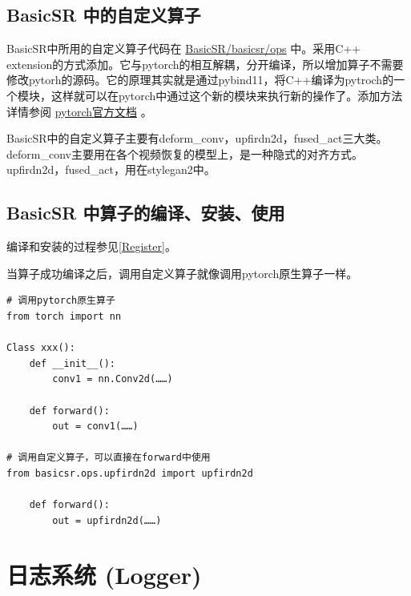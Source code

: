 \documentclass[../main.tex]{subfiles}
\begin{document}
\subsection{BasicSR 中的自定义算子}

BasicSR中所用的自定义算子代码在 \href{https://github.com/XPixelGroup/BasicSR/tree/master/basicsr/ops}{BasicSR/basicsr/ops} 中。采用C++ extension的方式添加。它与pytorch的相互解耦，分开编译，所以增加算子不需要修改pytorh的源码。它的原理其实就是通过pybind11，将C++编译为pytroch的一个模块，这样就可以在pytorch中通过这个新的模块来执行新的操作了。添加方法详情参阅 \href{https://pytorch.org/tutorials/advanced/cpp_extension.html#writing-a-mixed-c-cuda-extension}{pytorch官方文档} 。

BasicSR中的自定义算子主要有deform\_conv，upfirdn2d，fused\_act三大类。deform\_conv主要用在各个视频恢复的模型上，是一种隐式的对齐方式。upfirdn2d，fused\_act，用在stylegan2中。

\subsection{BasicSR 中算子的编译、安装、使用}

\begin{note} %
    编译和安装的过程参见\ref{Register}。
\end{note}

当算子成功编译之后，调用自定义算子就像调用pytorch原生算子一样。


\begin{verbatim}
# 调用pytorch原生算子
from torch import nn

Class xxx():
    def __init__():
        conv1 = nn.Conv2d(……)

    def forward():
        out = conv1(……)

# 调用自定义算子，可以直接在forward中使用
from basicsr.ops.upfirdn2d import upfirdn2d

    def forward():
        out = upfirdn2d(……)

\end{verbatim}

\section{日志系统 (Logger)} \label{code_structure:logger}
\end{document}
